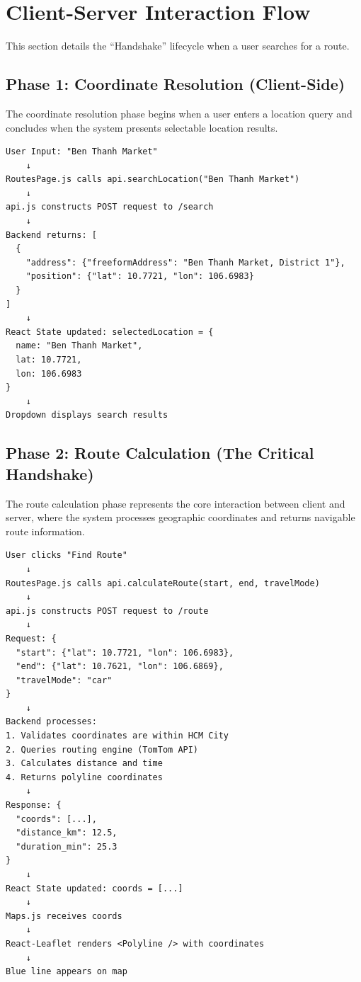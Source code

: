 \chapter{Client-Server Interaction Flow}

This section details the ``Handshake'' lifecycle when a user searches for a route.

\section{Phase 1: Coordinate Resolution (Client-Side)}

The coordinate resolution phase begins when a user enters a location query and concludes when the system presents selectable location results.

\begin{tcolorbox}[colback=gray!10,colframe=black!50,arc=2mm,title=Coordinate Resolution Flow]
\begin{verbatim}
User Input: "Ben Thanh Market"
    ↓
RoutesPage.js calls api.searchLocation("Ben Thanh Market")
    ↓
api.js constructs POST request to /search
    ↓
Backend returns: [
  {
    "address": {"freeformAddress": "Ben Thanh Market, District 1"},
    "position": {"lat": 10.7721, "lon": 106.6983}
  }
]
    ↓
React State updated: selectedLocation = {
  name: "Ben Thanh Market",
  lat: 10.7721,
  lon: 106.6983
}
    ↓
Dropdown displays search results
\end{verbatim}
\end{tcolorbox}

\section{Phase 2: Route Calculation (The Critical Handshake)}

The route calculation phase represents the core interaction between client and server, where the system processes geographic coordinates and returns navigable route information.

\begin{tcolorbox}[colback=gray!10,colframe=black!50,arc=2mm,title=Route Calculation Flow]
\begin{verbatim}
User clicks "Find Route"
    ↓
RoutesPage.js calls api.calculateRoute(start, end, travelMode)
    ↓
api.js constructs POST request to /route
    ↓
Request: {
  "start": {"lat": 10.7721, "lon": 106.6983},
  "end": {"lat": 10.7621, "lon": 106.6869},
  "travelMode": "car"
}
    ↓
Backend processes:
1. Validates coordinates are within HCM City
2. Queries routing engine (TomTom API)
3. Calculates distance and time
4. Returns polyline coordinates
    ↓
Response: {
  "coords": [...],
  "distance_km": 12.5,
  "duration_min": 25.3
}
    ↓
React State updated: coords = [...]
    ↓
Maps.js receives coords
    ↓
React-Leaflet renders <Polyline /> with coordinates
    ↓
Blue line appears on map
\end{verbatim}
\end{tcolorbox}

